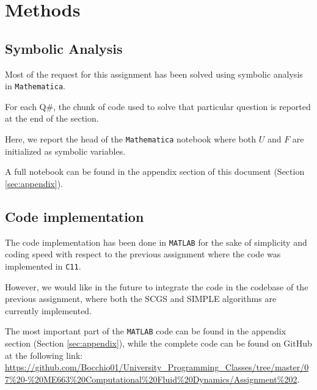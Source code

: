 \section{Methods}
\label{sec:methods}

\subsection{Symbolic Analysis}

Most of the request for this assignment has been solved using symbolic analysis in \texttt{Mathematica}.

For each Q\#, the chunk of code used to solve that particular question is reported at the end of the section.

Here, we report the head of the \texttt{Mathematica} notebook where both $U$ and $F$ are initialized as symbolic variables.



A full notebook can be found in the appendix section of this document (Section \ref{sec:appendix}).

\subsection{Code implementation}

The code implementation has been done in \texttt{MATLAB} for the sake of simplicity and coding speed with respect to the previous assignment where the code was implemented in \texttt{C11}.

However, we would like in the future to integrate the code in the codebase of the previous assignment, where both the SCGS and SIMPLE algorithms are currently implemented.

The most important part of the \texttt{MATLAB} code can be found in the appendix section (Section \ref{sec:appendix}), while the complete code can be found on GitHub at the following link: \url{https://github.com/Bocchio01/University_Programming_Classes/tree/master/07%20-%20ME663%20Computational%20Fluid%20Dynamics/Assignment%202}.